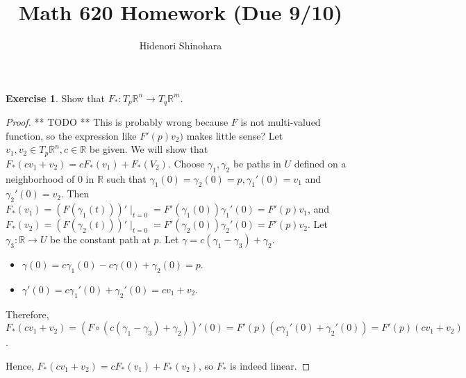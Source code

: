 \documentclass[12pt, psamsfonts]{amsart}
\theoremstyle{definition}
\newtheorem*{exer}{Exercise}
\theoremstyle{remark}
\numberwithin{equation}{section}
\begin{document}
\title{Math 620 Homework (Due 9/10)}
\author{Hidenori Shinohara}
\maketitle

\begin{exer}
  Show that $F_*: T_p\mathbb{R}^n \rightarrow T_q\mathbb{R}^m$.
\end{exer}

\begin{proof}
** TODO **
This is probably wrong because $F$ is not multi-valued function, so the expression like $F'(p)v_2)$ makes little sense?
  Let $v_1, v_2 \in T_p\mathbb{R}^n, c \in \mathbb{R}$ be given.
  We will show that $F_*(cv_1 + v_2) = cF_*(v_1) + F_*(V_2)$.
  Choose $\gamma_1, \gamma_2$ be paths in $U$ defined on a neighborhood of $0$ in $\mathbb{R}$ such that $\gamma_1(0) = \gamma_2(0) = p, \gamma_1'(0) = v_1$ and $\gamma_2'(0) = v_2$.
  Then $F_*(v_1) = (F(\gamma_1(t)))'\mid_{t = 0} = F'(\gamma_1(0))\gamma_1'(0) = F'(p)v_1$, and $F_*(v_2) = (F(\gamma_2(t)))'\mid_{t = 0} = F'(\gamma_2(0))\gamma_2'(0) = F'(p)v_2$.
  Let $\gamma_3: \mathbb{R} \rightarrow U$ be the constant path at $p$.
  Let $\gamma = c(\gamma_1 - \gamma_3) + \gamma_2$.
  \begin{itemize}
    \item
      $\gamma(0) = c\gamma_1(0) - c\gamma(0) + \gamma_2(0) = p$.
    \item
      $\gamma'(0) = c\gamma_1'(0) + \gamma_2'(0) = cv_1 + v_2$.
  \end{itemize}
  Therefore, $F_*(cv_1 + v_2) = (F \circ (c(\gamma_1 - \gamma_3) + \gamma_2))'(0) = F'(p)(c\gamma_1'(0) + \gamma_2'(0)) = F'(p)(cv_1 + v_2)$.

  Hence, $F_*(cv_1 + v_2) = cF_*(v_1) + F_*(v_2)$, so $F_*$ is indeed linear.
\end{proof}
\end{document}
